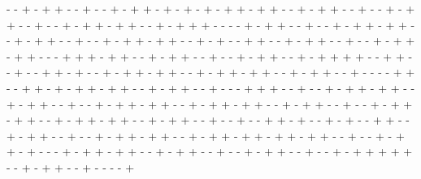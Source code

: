 - - + - + + - - + - - + - + + - + - + - + - + + - + + - - + - + + - - + - - + - + + - - + - - + - + + - + + - - + - + + + - - - - + - + + - - + - - + - + + - + + - - + - + + - - + - - + - + + - + + - - + - + - - + + - - + - + + - - + - - + - + + - + + - - - + + + - + + - - + - + + - - + - - + - + + - - + - + + + + - - + + - - + - - + + - + - - + - + + - + + - - + - + + - + + - - + - + + - - + - - - - + + - - + + - + - + + - + + - - + - + + - - + - - - + + + - - + - - + - + + - + + - - + - + + - - + - - + - + + - + + - - + - + + - + + - - + - + + - - + - - + - + + - + + - - + - + + - + + - - + - + + - - + - - + - - + + - + - - + - + - - + + - - + - + + - - + - - + - + + - + + - - + - + + - + + - + + - + + - - + - - + - + + - + - - - + - + + - + + - - + - + + - - + - - + - + + - - + - - + - + + + + + - - + - + + - - + - - - - + 

